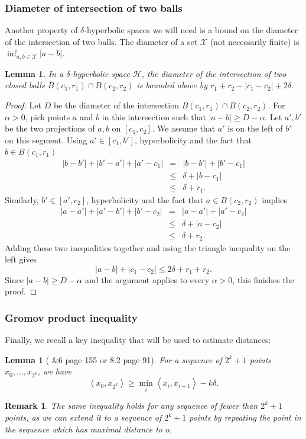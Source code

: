 \documentclass[11pt,letterpaper]{amsart}
\newtheorem{lemma}[theorem]{Lemma}
\newtheorem*{remark}{Remark}
\begin{document}
\subsubsection*{Diameter of intersection of two balls}
Another property of $\delta$-hyperbolic spaces we will need is a bound on the diameter of the intersection of two balls. The diameter of a set $\mathcal X$ (not necessarily finite) is $\inf_{a,b\in\mathcal X}|a-b|$. 
\begin{lemma}
\label{twoballs}
In a $\delta$-hyperbolic space $\mathcal H$, 
the diameter of the intersection of two closed balls $B(c_1,r_1)\cap B(c_2,r_2)$ is bounded above by 
$
r_1+r_2-|c_1-c_2|+2\delta. 
$
\end{lemma}
\begin{proof}
Let $D$ be the diameter of the intersection $B(c_1,r_1)\cap B(c_2,r_2)$. For $\alpha>0$, pick points $a$ and $b$ in this intersection such that $|a-b|\geq D-\alpha$. Let $a',b'$ be the two projections of $a, b$ on $[c_1, c_2]$. We assume that $a'$ is on the left of $b'$ on this segment. Using $a'\in[c_1,b']$, hyperbolicity and the fact that $b \in B (c_1, r_1)$
\begin{eqnarray*}
| b - b' | + |b'-a'|+|a'-c_1|&=&|b-b'|+|b'-c_1|\\
&\leqslant&\delta+| b - c_1| \\
&\leqslant&\delta+r_1.
\end{eqnarray*}
Similarly, $b'\in[a',c_2]$, hyperbolicity and the fact that $a\in B(c_2,r_2)$ implies
\begin{eqnarray*}
|a-a'|+|a'-b'|+|b'-c_2|&=&| a - a' | + | a' - c_2 | \\
&\leqslant& \delta + | a - c_2|\\
&\leqslant& \delta+r_2.
\end{eqnarray*}
Adding these two inequalities together and using the triangle inequality on the left
gives
$$
|a-b|+|c_1-c_2|\leq 2\delta+r_1+r_2. 
$$
Since $|a-b|\geq D-\alpha$ and the argument applies to every $\alpha>0$, this finishes the proof. 
\end{proof}
\subsubsection*{Gromov product inequality} Finally, we recall a key inequality that will be used to estimate distances: 
\begin{lemma}[\cite{gromovhyperbolic} \&6 page 155 or \cite{cdp} 8.2 page 91]
\label{gromovproductinequality}
For a sequence of $2^k+1$ points $x_0,\dots,x_{2^k}$, we have 
$$
\left<x_0,x_{2^k}\right>\geq\min_i\left<x_i,x_{i+1}\right>-k\delta. 
$$
\end{lemma}
\begin{remark}
The same inequality holds for any sequence of fewer than $2^k+1$ points, as we can extend it to a sequence of $2^k+1$ points by repeating the point in the sequence which has maximal distance to $o$. 
\end{remark}
\end{document}
